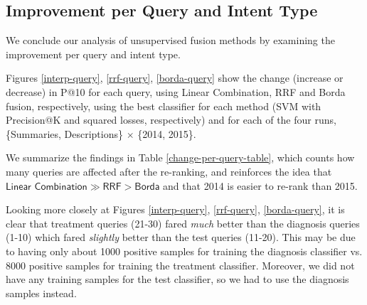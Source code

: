 \subsection{Improvement per Query and Intent Type}
We conclude our analysis of unsupervised fusion methods by examining the improvement per query and intent type.

Figures \ref{interp-query}, \ref{rrf-query}, \ref{borda-query} show the change (increase or decrease) in P@10 for each query,
using Linear Combination, RRF and Borda fusion, respectively, using the best classifier for each method (SVM with
Precision@K and squared losses, respectively) and for each of the four runs, \{Summaries, Descriptions\} $\times$ \{2014, 2015\}.

We summarize the findings in Table \ref{change-per-query-table}, which counts
how many queries are affected after the re-ranking,
and reinforces the idea that $\textsf{Linear Combination} \gg \textsf{RRF} > \textsf{Borda}$
and that 2014 is easier to re-rank than 2015.

\begin{table}
\centering
\caption{Number of positively/negatively affected queries for each of the three unsupervised fusion methods, using their best classifier (Tables \ref{interpolation-res}, \ref{rrf-res}
and \ref{borda-res}, respectively).}
\label{change-per-query-table}
\end{table}

Looking more closely at Figures \ref{interp-query}, \ref{rrf-query}, \ref{borda-query},
it is clear that
treatment queries (21-30) fared \emph{much} better than the diagnosis queries (1-10)
which fared \emph{slightly} better than the test queries (11-20).
This may be due to having only about 1000 positive samples for training the diagnosis classifier vs. 8000 positive samples
for training the treatment classifier. Moreover, we did not have any training samples for the test classifier,
so we had to use the diagnosis samples instead.

